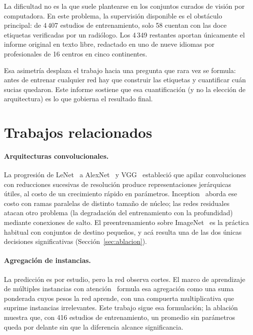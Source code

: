 \documentclass{article}
\begin{document}
La dificultad no es la que suele plantearse en los conjuntos curados de visión
por computadora. En este problema, la supervisión disponible es el obstáculo
principal: de 4\,407 estudios de entrenamiento, solo 58 cuentan con las doce
etiquetas verificadas por un radiólogo. Los 4\,349 restantes aportan únicamente
el informe original en texto libre, redactado en uno de nueve idiomas por
profesionales de 16 centros en cinco continentes.

Esa asimetría desplaza el trabajo hacia una pregunta que rara vez se formula:
antes de entrenar cualquier red hay que construir las etiquetas y cuantificar
cuán sucias quedaron. Este informe sostiene que esa cuantificación (y no la
elección de arquitectura) es lo que gobierna el resultado final.

\section{Trabajos relacionados}

\paragraph{Arquitecturas convolucionales.}
La progresión de LeNet~\citep{lecun1998gradient} a
AlexNet~\citep{krizhevsky2012imagenet} y VGG~\citep{simonyan2015very}
estableció que apilar convoluciones con reducciones sucesivas de resolución
produce representaciones jerárquicas útiles, al costo de un crecimiento rápido
en parámetros. Inception~\citep{szegedy2015going} aborda ese costo con ramas
paralelas de distinto tamaño de núcleo; las redes
residuales~\citep{he2016deep} atacan otro problema (la degradación del
entrenamiento con la profundidad) mediante conexiones de salto. El
preentrenamiento sobre ImageNet~\citep{deng2009imagenet} es la práctica
habitual con conjuntos de destino pequeños, y acá resulta una de las dos
únicas decisiones significativas (Sección~\ref{sec:ablacion}).

\paragraph{Agregación de instancias.}
La predicción es por estudio, pero la red observa cortes. El marco de aprendizaje
de múltiples instancias con atención~\citep{ilse2018attention} formula esa
agregación como una suma ponderada cuyos pesos la red aprende, con una compuerta
multiplicativa que suprime instancias irrelevantes. Este trabajo sigue esa
formulación; la ablación muestra que, con 416 estudios de entrenamiento, un
promedio sin parámetros queda por delante sin que la diferencia alcance
significancia.
\end{document}
